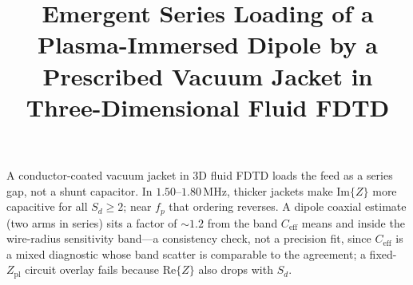 \documentclass[draft]{agujournal2025}
\begin{document}

\title{Emergent Series Loading of a Plasma-Immersed Dipole by a Prescribed Vacuum Jacket in Three-Dimensional Fluid FDTD}





\keypoints%
{A conductor-coated vacuum jacket in 3D fluid FDTD loads the feed as a series gap, not a shunt capacitor.}%
{In \(1.50\)--\(1.80\,\mathrm{MHz}\), thicker jackets make \(\mathrm{Im}\{Z\}\) more capacitive for all \(S_d\ge 2\); near \(f_p\) that ordering reverses.}%
{A dipole coaxial estimate (two arms in series) sits a factor of \(\sim 1.2\) from the band \(C_\mathrm{eff}\) means and inside the wire-radius sensitivity band---a consistency check, not a precision fit, since \(C_\mathrm{eff}\) is a mixed diagnostic whose band scatter is comparable to the agreement; a fixed-\(Z_\mathrm{pl}\) circuit overlay fails because \(\mathrm{Re}\{Z\}\) also drops with \(S_d\).}

\maketitle
\end{document}
